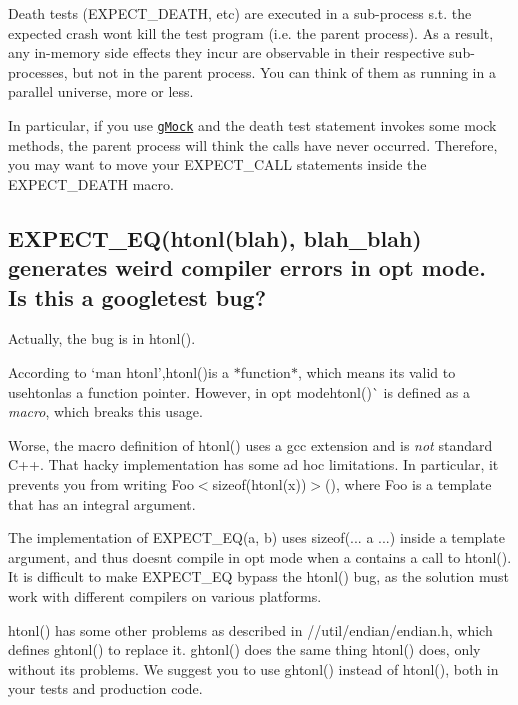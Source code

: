 Death tests ({\ttfamily E\+X\+P\+E\+C\+T\+\_\+\+D\+E\+A\+TH}, etc) are executed in a sub-\/process s.\+t. the expected crash won\textquotesingle{}t kill the test program (i.\+e. the parent process). As a result, any in-\/memory side effects they incur are observable in their respective sub-\/processes, but not in the parent process. You can think of them as running in a parallel universe, more or less.

In particular, if you use \href{../../googlemock}{\tt g\+Mock} and the death test statement invokes some mock methods, the parent process will think the calls have never occurred. Therefore, you may want to move your {\ttfamily E\+X\+P\+E\+C\+T\+\_\+\+C\+A\+LL} statements inside the {\ttfamily E\+X\+P\+E\+C\+T\+\_\+\+D\+E\+A\+TH} macro.

\subsection*{E\+X\+P\+E\+C\+T\+\_\+\+E\+Q(htonl(blah), blah\+\_\+blah) generates weird compiler errors in opt mode. Is this a googletest bug?}

Actually, the bug is in {\ttfamily htonl()}.

According to `\textquotesingle{}man htonl'{\ttfamily ,}htonl(){\ttfamily is a $\ast$function$\ast$, which means it\textquotesingle{}s valid to use}htonl{\ttfamily as a function pointer. However, in opt mode}htonl()\`{} is defined as a {\itshape macro}, which breaks this usage.

Worse, the macro definition of {\ttfamily htonl()} uses a {\ttfamily gcc} extension and is {\itshape not} standard C++. That hacky implementation has some ad hoc limitations. In particular, it prevents you from writing {\ttfamily Foo$<$sizeof(htonl(x))$>$()}, where {\ttfamily Foo} is a template that has an integral argument.

The implementation of {\ttfamily E\+X\+P\+E\+C\+T\+\_\+\+E\+Q(a, b)} uses {\ttfamily sizeof(... a ...)} inside a template argument, and thus doesn\textquotesingle{}t compile in opt mode when {\ttfamily a} contains a call to {\ttfamily htonl()}. It is difficult to make {\ttfamily E\+X\+P\+E\+C\+T\+\_\+\+EQ} bypass the {\ttfamily htonl()} bug, as the solution must work with different compilers on various platforms.

{\ttfamily htonl()} has some other problems as described in {\ttfamily //util/endian/endian.h}, which defines {\ttfamily ghtonl()} to replace it. {\ttfamily ghtonl()} does the same thing {\ttfamily htonl()} does, only without its problems. We suggest you to use {\ttfamily ghtonl()} instead of {\ttfamily htonl()}, both in your tests and production code.

